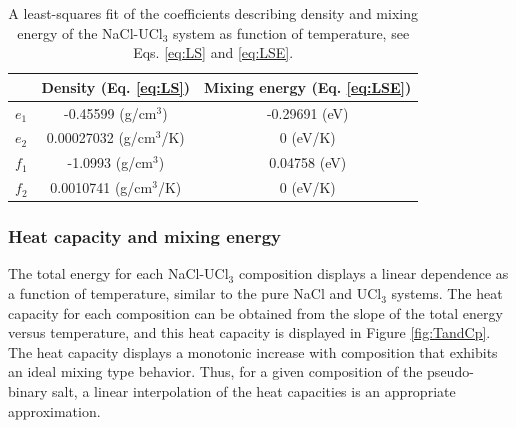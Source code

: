 \documentclass[preprint,3p,10pt,onecolumn,number,sort&compress]{elsarticle}
\begin{document}
{%


\begin{table}[hb!]
\centering
\begin{tabular}{lcc}
\hline
\hline
&Density (Eq. \ref{eq:LS}) &Mixing energy (Eq. \ref{eq:LSE}) \\
\hline
$e_1$ &-0.45599 (g/cm$^3$) &-0.29691 (eV) \\
$e_2$ &0.00027032 (g/cm$^3$/K) &0 (eV/K)\\
$f_1$ &-1.0993 (g/cm$^3$) &0.04758 (eV) \\
$f_2$ &0.0010741 (g/cm$^3$/K) &0 (eV/K)\\
\hline
\hline
\end{tabular}
\caption{A least-squares fit of the coefficients describing density and mixing energy of the NaCl-UCl$_3$ system as function of temperature, see Eqs. \ref{eq:LS} and \ref{eq:LSE}.}%
\label{table:LS}
\end{table}

\FloatBarrier

\subsubsection{Heat capacity and mixing energy}
The total energy for each NaCl-UCl$_3$ composition displays a linear dependence as a function of temperature, similar to the pure NaCl and UCl$_3$ systems. The heat capacity for each composition can be obtained from the slope of the total energy versus temperature, and this heat capacity is displayed in Figure \ref{fig:TandCp}. The heat capacity displays a monotonic increase with composition that exhibits an ideal mixing type behavior. Thus, for a given composition of the pseudo-binary salt, a linear interpolation of the heat capacities is an appropriate approximation. 

}
\end{document}
